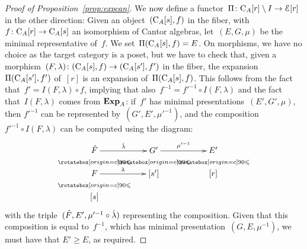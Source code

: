 \begin{proof}[Proof of Proposition~\ref{prop:expcan}]
We now define a functor~\hbox{$\Pi\colon \mathrm{C}_A[r]\setminus I\to\mathcal{E}[r]$} in the other direction: Given an object~$(\mathrm{C}_A[s],f)$ in the fiber, with~$f\colon\mathrm{C}_A[r]\to\mathrm{C}_A[s]$ an isomorphism of Cantor algebras, let~\hbox{$(E,G,\mu)$} be the minimal representative of~$f$. We set~$\Pi (\mathrm{C}_A[s],f)=E$. On morphisms, we have no choice as the target category is a poset, but we have to check that, given a morphism~$(F,\lambda)\colon(\mathrm{C}_A[s],f)\to(\mathrm{C}_A[s'],f')$ in the fiber, the expansion~$\Pi(\mathrm{C}_A[s'],f')$ of~$[r]$ is an expansion of~$\Pi(\mathrm{C}_A[s],f)$. This follows from the fact that~\hbox{$f'= I(F,\lambda)\circ f$}, implying that also~\hbox{$f^{-1}= f'^{-1}\circ I(F,\lambda)$}  and the fact that~$I(F,\lambda)$ comes from $\mathbf{Exp}_A$:  
if~$f'$ has minimal presentations~$(E',G',\mu)$, then $f'^{-1}$ can be represented by~$(G',E',\mu'^{-1})$, and the composition~$f'^{-1}\circ I(F,\lambda)$ can be computed using the diagram: 
$$\xymatrix@R-1pc{ \hat F \ar@{}[d]|{\IV}\ar[rr]^-{\hat\la}&&   G' \ar@{}[d]|{\IV} \ar[rr]^-{\mu'^{-1}} && E' \ar@{}[d]|{\IV}\\
 F \ar@{}[d]|{\IV}\ar[rr]^-{\la} &&  [s']& & [r] \\
[s] &  & &&
}$$
with the triple~$(\hat F,E',\mu'^{-1}\circ \hat{\lambda})$ representing the composition.  
Given that this composition is equal to~$f^{-1}$, which has minimal presentation~$(G,E,\mu^{-1})$, we must have that $E'\ge E$, as required. 


\end{proof}
